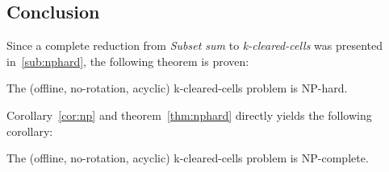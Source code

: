 \subsection{Conclusion}

Since a complete reduction from \textit{Subset sum} to \textit{k-cleared-cells} was presented in~\ref{sub:nphard}, the following theorem is proven:

\begin{thm}
\label{thm:nphard}
The (offline, no-rotation, acyclic) k-cleared-cells problem is NP-hard.
\end{thm}

Corollary~\ref{cor:np} and theorem~\ref{thm:nphard} directly yields the following corollary: \\

\begin{cor}
The (offline, no-rotation, acyclic) k-cleared-cells problem is NP-complete.
\end{cor}
